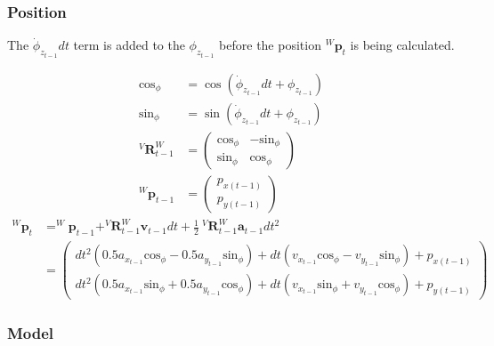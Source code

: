 \documentclass{article}
\newcommand{\Rotation}[3]{^{#1}\textbf{R}^{#2}_{#3}}
\newcommand{\Position}[2]{^{#1}\textbf{p}_{#2}}
\begin{document}
\subsubsection{Position}

The $\dot{\phi}_{z_{t-1}} dt$ term is added to the $\phi_{z_{t-1}}$ before the position $\Position{W}{t}$ is being calculated.

\begin{align}
  \textrm{cos}_\phi &= \cos{\left(\dot{\phi}_{z_{t-1}} dt + \phi_{z_{t-1}} \right)} \\
  \textrm{sin}_\phi &= \sin{\left(\dot{\phi}_{z_{t-1}} dt + \phi_{z_{t-1}} \right)} \\
  \Rotation{V}{W}{t-1} &= 
  \left(\begin{matrix}\textrm{cos}_\phi & - \textrm{sin}_\phi\\\textrm{sin}_\phi & \textrm{cos}_\phi\end{matrix}\right) \\  
  \Position{W}{t-1} &= \left(\begin{matrix}p_{x (t-1)}\\p_{y (t-1)}\end{matrix}\right)
\end{align}
\begin{align}
  \Position{W}{t} &= \Position{W}{t-1} + \Rotation{V}{W}{t-1}\textbf{v}_{t-1}dt + \frac{1}{2}\ \Rotation{V}{W}{t-1}\textbf{a}_{t-1}dt^2 \\
  &= \left(\begin{matrix}dt^{2} \left(0.5 a_{x_{t-1}} \textrm{cos}_\phi - 0.5 a_{y_{t-1}} \textrm{sin}_\phi\right) + dt \left(v_{x_{t-1}} \textrm{cos}_\phi - v_{y_{t-1}} \textrm{sin}_\phi\right) + p_{x (t-1)}\\dt^{2} \left(0.5 a_{x_{t-1}} \textrm{sin}_\phi + 0.5 a_{y_{t-1}} \textrm{cos}_\phi\right) + dt \left(v_{x_{t-1}} \textrm{sin}_\phi + v_{y_{t-1}} \textrm{cos}_\phi\right) + p_{y (t-1)}\end{matrix}\right)
\end{align}

\subsubsection{Model}
\end{document}
